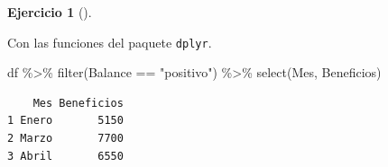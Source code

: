\documentclass[
  a4paper,
]{scrreport}
\newenvironment{Shaded}{\begin{snugshade}}{\end{snugshade}}
\newcommand{\FunctionTok}[1]{\textcolor[rgb]{0.28,0.35,0.67}{#1}}
\newcommand{\NormalTok}[1]{\textcolor[rgb]{0.00,0.23,0.31}{#1}}
\newcommand{\SpecialCharTok}[1]{\textcolor[rgb]{0.37,0.37,0.37}{#1}}
\newcommand{\StringTok}[1]{\textcolor[rgb]{0.13,0.47,0.30}{#1}}
\theoremstyle{definition}
\newtheorem{exercise}{Ejercicio}[chapter]
\theoremstyle{remark}
\begin{document}
\begin{exercise}[]
\begin{tcolorbox}
Con las funciones del paquete \texttt{dplyr}.

\begin{Shaded}
\begin{Highlighting}[]
\NormalTok{df }\SpecialCharTok{\%\textgreater{}\%}
    \FunctionTok{filter}\NormalTok{(Balance }\SpecialCharTok{==} \StringTok{"positivo"}\NormalTok{) }\SpecialCharTok{\%\textgreater{}\%} 
    \FunctionTok{select}\NormalTok{(Mes, Beneficios)}
\end{Highlighting}
\end{Shaded}

\begin{verbatim}
    Mes Beneficios
1 Enero       5150
2 Marzo       7700
3 Abril       6550
\end{verbatim}

\end{tcolorbox}

\end{exercise}
\end{document}
